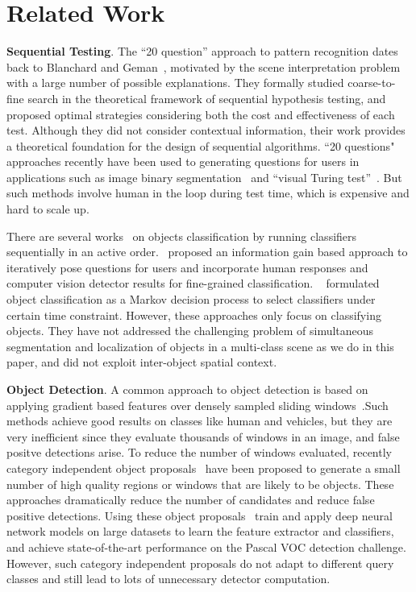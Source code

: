 \section{Related Work}
\label{sec:relatedwork}

{\bf{Sequential Testing}}. 
The ``20 question'' approach to pattern recognition dates back to Blanchard and Geman~\cite{blanchard2005hierarchical}, motivated by the scene interpretation problem with a large number of possible explanations. They formally studied coarse-to-fine search in the theoretical framework of sequential hypothesis testing, and proposed optimal strategies considering both the cost and effectiveness of each test. Although they did not consider contextual information, their work provides a theoretical foundation for the design of sequential algorithms. ``20 questions" approaches recently have been used to generating questions for users in applications such as image binary segmentation~\cite{rupprecht2015image} and ``visual Turing test''~\cite{geman2015visual}. But such methods involve human in the loop during test time, which is expensive and hard to scale up. 

There are several works~\cite{gao2011active} on objects classification by running classifiers sequentially in an active order.~\cite{branson2010visual} proposed an information gain based approach to iteratively pose questions for users and incorporate human responses and computer vision detector results for fine-grained classification.
~\cite{sergey2012timely} formulated object classification as a Markov decision process to select classifiers under certain time constraint. However, these approaches only focus on classifying objects. They have not addressed the challenging problem of simultaneous segmentation and localization of objects in a multi-class scene as we do in this paper, and did not exploit inter-object spatial context.

{\bf Object Detection}. 
A common approach to object detection is based on applying gradient based features over densely sampled sliding windows~\cite{felzenszwalb2010object}.Such methods achieve good results on classes like human and vehicles, but they are very inefficient since they evaluate thousands of windows in an image, and false positve detections arise. To reduce the number of windows evaluated,  recently category independent object proposals~\cite{carreira2012cpmc,van2011segmentation,arbelaez2014multiscale} have been proposed to generate a small number of high quality regions or windows that are likely to be objects. These approaches dramatically reduce the number of candidates and reduce false positive detections. Using these object proposals~\cite{girshick14CVPR, BharathECCV2014} train and apply deep neural network models on large datasets to learn the feature extractor and classifiers, and achieve state-of-the-art performance on the Pascal VOC detection challenge. However, such category independent proposals do not adapt to different query classes and still lead to lots of unnecessary detector computation. 

